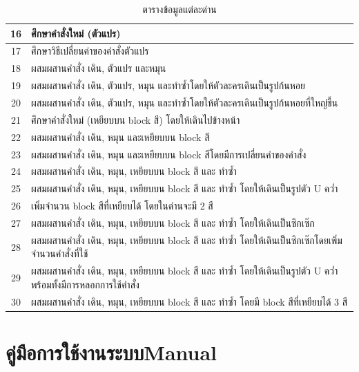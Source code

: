 \begin{table}[H]
\begin{center}
\begin{tabularx}{\textwidth}{|c | X|}
            \hline
            16 &  ศึกษาคำสั่งใหม่ (ตัวแปร) \\ 
            \hline
            17 &  ศึกษาวิธีเปลี่ยนค่าของคำสั่งตัวแปร \\ 
            \hline
            18 &  ผสมผสานคำสั่ง เดิน, ตัวแปร และหมุน \\ 
            \hline
            19 &  ผสมผสานคำสั่ง เดิน, ตัวแปร, หมุน และทำซ้ำโดยให้ตัวละครเดินเป็นรูปก้นหอย \\ 
            \hline
            20 &  ผสมผสานคำสั่ง เดิน, ตัวแปร, หมุน และทำซ้ำโดยให้ตัวละครเดินเป็นรูปก้นหอยที่ใหญ่ขึ้น \\ 
            \hline
            21 &  ศึกษาคำสั่งใหม่ (เหยียบบน block สี) โดยให้เดินไปข้างหน้า \\ 
            \hline
            22 &  ผสมผสานคำสั่ง เดิน, หมุน และเหยียบบน block สี \\ 
            \hline
            23 &  ผสมผสานคำสั่ง เดิน, หมุน และเหยียบบน block สีโดยมีการเปลี่ยนค่าของคำสั่ง \\ 
            \hline
            24 &  ผสมผสานคำสั่ง เดิน, หมุน, เหยียบบน block สี และ ทำซ้ำ \\ 
            \hline
            25 &  ผสมผสานคำสั่ง เดิน, หมุน, เหยียบบน block สี และ ทำซ้ำ โดยให้เดินเป็นรูปตัว U คว่ำ \\ 
            \hline
            26 &  เพิ่มจำนวน block สีที่เหยียบได้ โดยในด่านจะมี 2 สี \\ 
            \hline
            27 &  ผสมผสานคำสั่ง เดิน, หมุน, เหยียบบน block สี และ ทำซ้ำ โดยให้เดินเป็นซิกเซ๊ก \\ 
            \hline
            28 &  ผสมผสานคำสั่ง เดิน, หมุน, เหยียบบน block สี และ ทำซ้ำ โดยให้เดินเป็นซิกเซ๊กโดยเพิ่มจำนวนคำสั่งที่ใช้ \\ 
            \hline
            29 &  ผสมผสานคำสั่ง เดิน, หมุน, เหยียบบน block สี และ ทำซ้ำ โดยให้เดินเป็นรูปตัว U คว่ำพร้อมทั้งมีการหลอกการใช้คำสั่ง \\ 
            \hline
            30 &  ผสมผสานคำสั่ง เดิน, หมุน, เหยียบบน block สี และ ทำซ้ำ โดยมี block สีที่เหยียบได้ 3 สี \\ 
            \hline
        \end{tabularx}
    \end{center}
    \caption[ตารางข้อมูลแต่ละด่าน]{ตารางข้อมูลแต่ละด่าน}
    \label{maptable}
\end{table}

\chapter{\ifcpe คู่มือการใช้งานระบบ\else Manual\fi}

